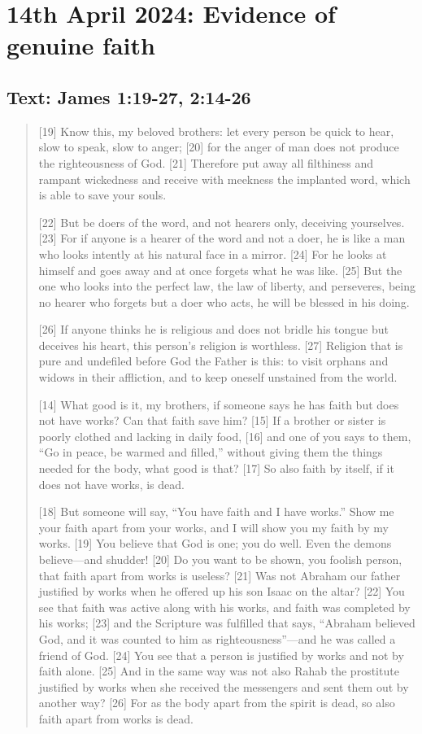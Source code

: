 \setcounter{figure}{0}

\section{14th April 2024: Evidence of genuine faith}
\subsection*{Text: James 1:19-27, 2:14-26}
  \begin{quote}
    [19] Know this, my beloved brothers: let every person be quick to hear, slow to speak, slow to anger; [20] for the anger of man does not produce the righteousness of God. [21] Therefore put away all filthiness and rampant wickedness and receive with meekness the implanted word, which is able to save your souls.

    [22] But be doers of the word, and not hearers only, deceiving yourselves. [23] For if anyone is a hearer of the word and not a doer, he is like a man who looks intently at his natural face in a mirror. [24] For he looks at himself and goes away and at once forgets what he was like. [25] But the one who looks into the perfect law, the law of liberty, and perseveres, being no hearer who forgets but a doer who acts, he will be blessed in his doing.

    [26] If anyone thinks he is religious and does not bridle his tongue but deceives his heart, this person’s religion is worthless. [27] Religion that is pure and undefiled before God the Father is this: to visit orphans and widows in their affliction, and to keep oneself unstained from the world.

    [14] What good is it, my brothers, if someone says he has faith but does not have works? Can that faith save him? [15] If a brother or sister is poorly clothed and lacking in daily food, [16] and one of you says to them, “Go in peace, be warmed and filled,” without giving them the things needed for the body, what good is that? [17] So also faith by itself, if it does not have works, is dead.

    [18] But someone will say, “You have faith and I have works.” Show me your faith apart from your works, and I will show you my faith by my works. [19] You believe that God is one; you do well. Even the demons believe—and shudder! [20] Do you want to be shown, you foolish person, that faith apart from works is useless? [21] Was not Abraham our father justified by works when he offered up his son Isaac on the altar? [22] You see that faith was active along with his works, and faith was completed by his works; [23] and the Scripture was fulfilled that says, “Abraham believed God, and it was counted to him as righteousness”—and he was called a friend of God. [24] You see that a person is justified by works and not by faith alone. [25] And in the same way was not also Rahab the prostitute justified by works when she received the messengers and sent them out by another way? [26] For as the body apart from the spirit is dead, so also faith apart from works is dead.
  \end{quote}
